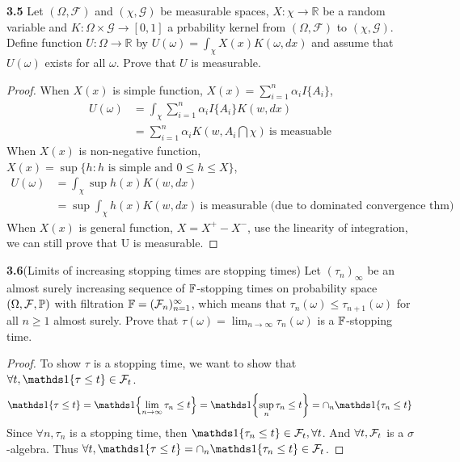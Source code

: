 \noindent\textbf{3.5}
Let $(\Omega, \mathcal{F})$ and $(\chi,\mathcal{G})$ be measurable spaces, $X: \chi \to \mathbb{R}$ be a random variable and $K: \Omega\times \mathcal{G} \to [0,1]$ a prbability kernel from $(\Omega, \mathcal{F})$ to $(\chi,\mathcal{G})$. Define function $U:\Omega \to \mathbb{R}$ by $U(\omega) = \int_\chi X(x) K(\omega,dx)$ and assume that $U(\omega)$ exists for all $\omega$. Prove that $U$ is measurable. 
\begin{proof}
    When $X(x)$ is simple function, $X(x) = \sum_{i = 1}^n \alpha_i I\{A_i\}$,
    \begin{equation}
        \begin{aligned}
            U(\omega) &= \int_\chi \sum_{i = 1}^n \alpha_i I\{A_i\} K(w,dx)\\
            &= \sum_{i = 1}^n \alpha_i K(w,A_i\bigcap\chi)\ \text{is measuable}
        \end{aligned}
    \end{equation}
    When $X(x)$ is non-negative function, $X(x) = \sup \{h: h \text{ is simple and } 0\leq h \leq X\}$, 
    \begin{equation}
        \begin{aligned}
            U(\omega) &= \int_\chi \sup h(x) K(w,dx)\\
            & = \sup \int_\chi h(x) K(w,dx) \ \text{is measurable (due to dominated convergence thm)} 
        \end{aligned}
    \end{equation}
    When $X(x)$ is general function, $X = X^+ - X^-$, use the linearity of integration, we can still prove that U is measurable. 
\end{proof}



\noindent\textbf{3.6}(Limits of increasing stopping times are stopping times) Let $(\tau_n)_{\infty}$ be an almost surely increasing sequence of $\mathbb{F}$-stopping times on probability space $(\Omega,\mathcal{F},\mathbb{P})$ with filtration $\mathbb{F} = (\mathcal{F}_n)_{n=1}^{\infty}$, which means that $\tau_n(\omega) \le \tau_{n+1}(\omega)$ for all $n\ge 1$ almost surely. Prove that $\tau(\omega)=\lim_{n\to \infty}\tau_n(\omega)$ is a $\mathbb{F}$-stopping time. 

\begin{proof}
    To show $\tau$ is a stopping time, we want to show that $\forall t, \bOne{\tau \le t} \in \cF_t$. 
    \begin{align*}
        \bOne{\tau \le t} = \bOne{\lim_{n\to \infty}\tau_n \le t} = \bOne{\sup_n \tau_n \le t}   = \cap_n \bOne{\tau_n \le t} 
    \end{align*}
    Since $\forall n, \tau_n$ is a stopping time, then $\bOne{\tau_n\le t} \in \cF_t,\forall t$. And $\forall t, \mathcal{F}_t$ is a $\sigma$-algebra. Thus $\forall t, \bOne{\tau \le t} = \cap_n \bOne{\tau_n \le t}  \in \cF_t$. 
\end{proof}


